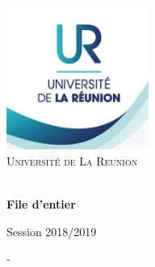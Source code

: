 \documentclass[a4paper]{report}
\begin{document}

\begin{titlepage}
\begin{center}

\includegraphics[width=0.35\textwidth]{./logo}~\\[1.5cm]



\textsc{\LARGE Université de La Reunion}\\[0.2cm]


\textsc{\Large }\\[0.5cm]





\huge \bfseries File d'entier\\



\end{center}

\vfill

\large {Session 2018/2019}

\end{titlepage}


\newpage
-
\thispagestyle{empty}
\newpage


\begin{abstract}
    
    \begin{spacing}{1.5}
    En résumé, cet exercice du TP consiste à modéliser un producteur et des consommateurs (d'un domaine quelconque) avec un système de file d'attente. Le producteur fournit à la file d'attente jusqu'à ce qu'elle soit pleine et les consommateurs consomment jusqu'à l'indisponibilité de la ressource, autrement dit lorsqu'il n'y a plus de produit dans la file d'attente. j'ai choisi de rajouter la possibilité de mettre en pause les consommateurs et le producteur pour que même s'il y ait disponibilité de ressources ou même si la file n'est pas pleine, le producteur et les consommateurs arrêtent leurs activités. Une interface graphique a aussi été rajouter pour l'utilisateur du programme (interface en java et python). 
    \end{spacing}
    
\end{abstract}
\end{document}
